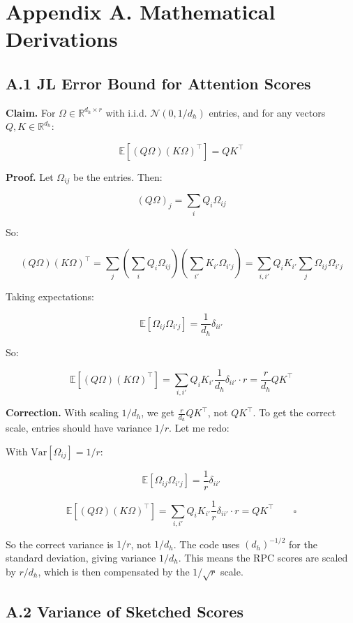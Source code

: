 
\section{Appendix A. Mathematical Derivations}

\subsection{A.1 JL Error Bound for Attention Scores}

\textbf{Claim.} For $\Omega \in \mathbb{R}^{d_h \times r}$ with i.i.d. 
$\mathcal{N}(0, 1/d_h)$ entries, and for any vectors $Q, K \in \mathbb{R}^{d_h}$:

\[
\mathbb{E}[(Q\Omega)(K\Omega)^\top] = Q K^\top
\tag{A.1}
\]

\textbf{Proof.} Let $\Omega_{ij}$ be the entries. Then:

\[
(Q\Omega)_j = \sum_i Q_i \Omega_{ij}
\]

So:

\[
(Q\Omega)(K\Omega)^\top = \sum_j \left(\sum_i Q_i \Omega_{ij}\right) \left(\sum_{i'} K_{i'} \Omega_{i'j}\right)
= \sum_{i, i'} Q_i K_{i'} \sum_j \Omega_{ij} \Omega_{i'j}
\]

Taking expectations:

\[
\mathbb{E}[\Omega_{ij} \Omega_{i'j}] = \frac{1}{d_h} \delta_{ii'}
\]

So:

\[
\mathbb{E}[(Q\Omega)(K\Omega)^\top] = \sum_{i, i'} Q_i K_{i'} \frac{1}{d_h} \delta_{ii'} \cdot r = \frac{r}{d_h} Q K^\top
\]

\textbf{Correction.} With scaling $1/d_h$, we get $\frac{r}{d_h} Q K^\top$, not $Q K^\top$. To get the correct scale, entries should have variance $1/r$. Let me redo:

With $\text{Var}[\Omega_{ij}] = 1/r$:

\[
\mathbb{E}[\Omega_{ij} \Omega_{i'j}] = \frac{1}{r} \delta_{ii'}
\]

\[
\mathbb{E}[(Q\Omega)(K\Omega)^\top] = \sum_{i, i'} Q_i K_{i'} \frac{1}{r} \delta_{ii'} \cdot r = Q K^\top \qquad \square
\]

So the correct variance is $1/r$, not $1/d_h$. The code uses $(d_h)^{-1/2}$ for the standard deviation, giving variance $1/d_h$. This means the RPC scores are scaled by $r/d_h$, which is then compensated by the $1/\sqrt{r}$ scale.

\subsection{A.2 Variance of Sketched Scores}

